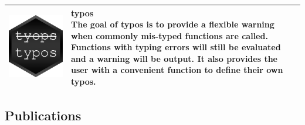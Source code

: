 \documentclass[
]{article}
\begin{document}
\begin{table}[H]
\centering\begingroup\fontsize{8}{10}\selectfont

\begin{tabular}{>{\raggedright\arraybackslash}p{}>{\raggedright\arraybackslash}p{}}
\toprule
\includegraphics{ img/logos/typos-logo.png} & \makecell[tp{0.7\textwidth}]{\textbf{ typos} \\  The goal of typos is to provide a flexible warning when commonly mis-typed functions are called. Functions with typing errors will still be evaluated and a warning will be output. It also provides the user with a convenient function to define their own typos. }\\
\bottomrule
\end{tabular}
\endgroup{}
\end{table}

\hypertarget{publications}{%
\subsection{Publications}\label{publications}}
\end{document}
